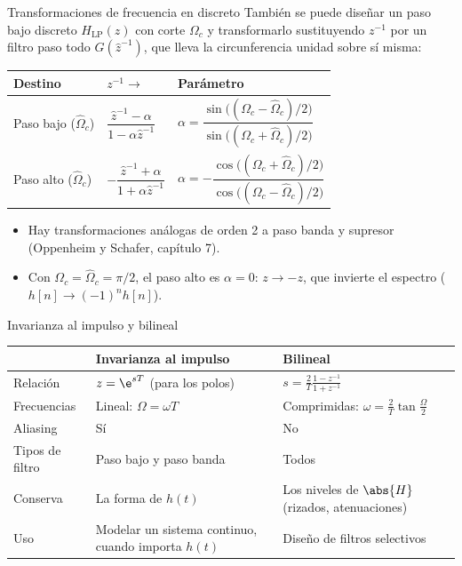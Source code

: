 \documentclass[aspectratio=169,11pt]{beamer}
\begin{document}
\begin{frame}{Transformaciones de frecuencia en discreto}
  \small
  También se puede diseñar un paso bajo discreto $H_{\text{LP}}(z)$ con corte $\Omega_c$ y transformarlo sustituyendo $z^{-1}$ por un filtro paso todo $G(\hat z^{-1})$, que lleva la circunferencia unidad sobre sí misma:
  \renewcommand{\arraystretch}{1.7}
  \begin{center}
    \begin{tabular}{@{}lll@{}}
      \toprule
      Destino & $z^{-1}\to$ & Parámetro\\\midrule
      Paso bajo ($\hat\Omega_c$) & $\dfrac{\hat z^{-1}-\alpha}{1-\alpha\hat z^{-1}}$ & $\alpha=\dfrac{\sin\big((\Omega_c-\hat\Omega_c)/2\big)}{\sin\big((\Omega_c+\hat\Omega_c)/2\big)}$\\
      Paso alto ($\hat\Omega_c$) & $-\dfrac{\hat z^{-1}+\alpha}{1+\alpha\hat z^{-1}}$ & $\alpha=-\dfrac{\cos\big((\Omega_c+\hat\Omega_c)/2\big)}{\cos\big((\Omega_c-\hat\Omega_c)/2\big)}$\\\bottomrule
    \end{tabular}
  \end{center}
  \begin{itemize}\footnotesize
    \item Hay transformaciones análogas de orden 2 a paso banda y supresor (Oppenheim y Schafer, capítulo 7).
    \item Con $\Omega_c=\hat\Omega_c=\pi/2$, el paso alto es $\alpha=0$: $z\to-z$, que invierte el espectro ($h[n]\to(-1)^nh[n]$).
  \end{itemize}
\end{frame}

\begin{frame}{Invarianza al impulso y bilineal}
  \footnotesize
  \renewcommand{\arraystretch}{1.25}
  \begin{center}
    \begin{tabular}{@{}p{}p{}p{}@{}}
      \toprule
      & Invarianza al impulso & Bilineal\\\midrule
      Relación & $z=\e^{sT}$ (para los polos) & $s=\frac2T\frac{1-z^{-1}}{1+z^{-1}}$\\
      Frecuencias & Lineal: $\Omega=\omega T$ & Comprimidas: $\omega=\frac2T\tan\frac\Omega2$\\
      Aliasing & Sí & No\\
      Tipos de filtro & Paso bajo y paso banda & Todos\\
      Conserva & La forma de $h(t)$ & Los niveles de $\abs{H}$ (rizados, atenuaciones)\\
      Uso & Modelar un sistema continuo, cuando importa $h(t)$ & Diseño de filtros selectivos\\\bottomrule
    \end{tabular}
  \end{center}
\end{frame}
\end{document}
